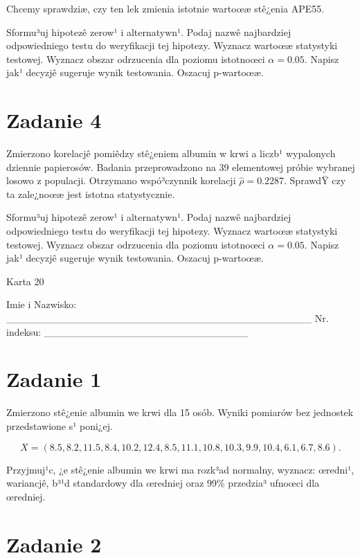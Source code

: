 \documentclass[a4paper,12pt]{article}
\begin{document}
  Chcemy sprawdziæ, czy ten lek zmienia istotnie wartoœæ stê¿enia APE55.
  
  Sformu³uj hipotezê zerow¹ i alternatywn¹. 
  Podaj nazwê najbardziej odpowiedniego testu do weryfikacji tej hipotezy. 
  Wyznacz wartoœæ statystyki testowej. 
  Wyznacz obszar odrzucenia dla poziomu istotnoœci $\alpha=0.05$. 
  Napisz jak¹ decyzjê sugeruje wynik testowania. Oszacuj p-wartoœæ. \vspace{1cm} 

  \section*{Zadanie 4}
     
     Zmierzono korelacjê pomiêdzy stê¿eniem albumin w krwi a liczb¹ wypalonych dziennie papierosów. 
     Badania przeprowadzono na 39 elementowej próbie wybranej losowo z populacji. 
     Otrzymano wspó³czynnik korelacji $\hat\rho = 0.2287 $. 
     SprawdŸ czy ta zale¿noœæ jest istotna statystycznie. 
     
     Sformu³uj hipotezê zerow¹ i alternatywn¹. 
     Podaj nazwê najbardziej odpowiedniego testu do weryfikacji tej hipotezy. 
     Wyznacz wartoœæ statystyki testowej. 
     Wyznacz obszar odrzucenia dla poziomu istotnoœci $\alpha=0.05$. 
     Napisz jak¹ decyzjê sugeruje wynik testowania. 
     Oszacuj p-wartoœæ. \vspace{1cm} 

  \clearpage  Karta  20  

 Imie i Nazwisko: \_\_\_\_\_\_\_\_\_\_\_\_\_\_\_\_\_\_\_\_\_\_\_\_\_\_\_\_\_\_\_\_\_\_\_\_\_\_\_\_\_\_ Nr. indeksu: \_\_\_\_\_\_\_\_\_\_\_\_\_\_\_\_\_\_\_\_\_\_\_\_\_\_\_\_ 
 \section*{Zadanie 1}
     
     Zmierzono stê¿enie albumin we krwi dla 15 osób. 
     Wyniki pomiarów bez jednostek przedstawione s¹ poni¿ej. 
     
     \noindent $$X=(  8.5,  8.2, 11.5,  8.4, 10.2, 12.4,  8.5, 11.1, 10.8, 10.3,  9.9, 10.4,  6.1,  6.7,  8.6 ).$$
     
     Przyjmuj¹c, ¿e stê¿enie albumin we krwi ma rozk³ad normalny, 
     wyznacz: œredni¹, wariancjê, b³¹d standardowy dla œredniej oraz 99\% przedzia³ ufnoœci dla œredniej. \vspace{1cm} 

  \section*{Zadanie 2}
     
\end{document}
